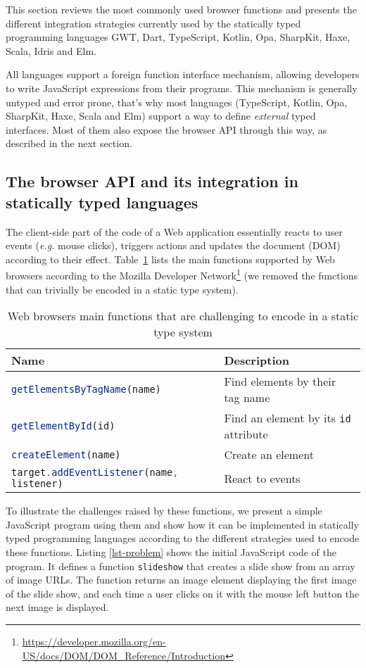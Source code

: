 \documentclass{llncs}
\newcommand{\jscode}[1]{\lstinline[language=JavaScript]|#1|}
\begin{document}
This section reviews the most commonly used browser functions and presents the different integration strategies currently used by the statically typed programming languages GWT, Dart, TypeScript, Kotlin, Opa, SharpKit, Haxe, Scala, Idris and Elm.

All languages support a foreign function interface mechanism, allowing developers to write JavaScript expressions from their programs. This mechanism is generally untyped and error prone, that's why most languages (TypeScript, Kotlin, Opa, SharpKit, Haxe, Scala and Elm) support a way to define \emph{external} typed interfaces. Most of them also expose the browser API through this way, as described in the next section.

\subsection{The browser API and its integration in statically typed languages}

The client-side part of the code of a Web application essentially reacts to user events (\emph{e.g.} mouse clicks), triggers actions and updates the document (DOM) according to their effect. Table~\ref{table-dom-api} lists the main functions supported by Web browsers according to the Mozilla Developer Network\footnote{\href{https://developer.mozilla.org/en-US/docs/DOM/DOM\_Reference/Introduction}{https://developer.mozilla.org/en-US/docs/DOM/DOM\_Reference/Introduction}} (we removed the functions that can trivially be encoded in a static type system).

\begin{table}
 \centering
 \begin{tabular}{ll}
  \hline
  Name & Description \\
  \hline
  \jscode{getElementsByTagName(name)} & Find elements by their tag name \\
  \jscode{getElementById(id)} & Find an element by its \jscode{id} attribute \\
  \jscode{createElement(name)} & Create an element \\
  \jscode{target.addEventListener(name, listener)} & React to events \\
  \hline
 \end{tabular}

 \label{table-dom-api}
 \caption{Web browsers main functions that are challenging to encode in a static type system}
\end{table}

To illustrate the challenges raised by these functions, we present a simple JavaScript program using them and show how it can be implemented in statically typed programming languages according to the different strategies used to encode these functions. Listing \ref{lst-problem} shows the initial JavaScript code of the program. It defines a function \jscode{slideshow} that creates a slide show from an array of image URLs. The function returns an image element displaying the first image of the slide show, and each time a user clicks on it with the mouse left button the next image is displayed.
\end{document}
